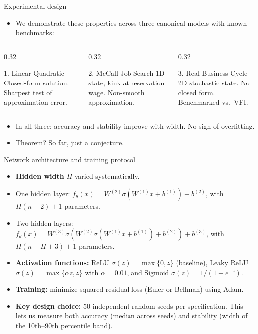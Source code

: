\documentclass[aspectratio=169,10pt]{beamer}
\newcommand{\emphcolor}[1]{\textbf{\textcolor{emphcolorval}{#1}}}
\begin{document}
\begin{frame}{Experimental design}
	\begin{itemize}
		\item We demonstrate these properties across three canonical models with known benchmarks:
	\end{itemize}
	\vspace{0.1in}
	\begin{columns}
		\begin{column}{0.32\textwidth}
			\begin{block}{1. Linear-Quadratic}
				Closed-form solution. Sharpest test of approximation error.
			\end{block}
		\end{column}
		\begin{column}{0.32\textwidth}
			\begin{block}{2. McCall Job Search}
				1D state, kink at reservation wage. Non-smooth approximation.
			\end{block}
		\end{column}
		\begin{column}{0.32\textwidth}
			\begin{block}{3. Real Business Cycle}
				2D stochastic state. No closed form. Benchmarked vs.\ VFI.
			\end{block}
		\end{column}
	\end{columns}
	\vspace{0.15in}
	\begin{itemize}
		\item In all three: accuracy and stability improve with width. No sign of overfitting.
		\item Theorem? So far, just a conjecture.
	\end{itemize}
\end{frame}

\begin{frame}{Network architecture and training protocol}
	\begin{itemize}
		\item \emphcolor{Hidden width} $H$ varied systematically.
		\item One hidden layer: $f_\theta(x) = W^{(2)} \sigma\!\left(W^{(1)}x + b^{(1)}\right) + b^{(2)}$, with $H(n+2)+1$ parameters.
		\item Two hidden layers: $f_\theta(x) = W^{(3)} \sigma\!\left(W^{(2)} \sigma\!\left(W^{(1)}x + b^{(1)}\right) + b^{(2)}\right) + b^{(3)}$, with $H(n+H+3)+1$ parameters.
		\item \emphcolor{Activation functions:} ReLU $\sigma(z) = \max\{0,z\}$ (baseline), Leaky ReLU $\sigma(z) = \max\{\alpha z, z\}$ with $\alpha = 0.01$, and Sigmoid $\sigma(z) = 1/(1+e^{-z})$.
		\item \emphcolor{Training:} minimize squared residual loss (Euler or Bellman) using Adam.
		\item \emphcolor{Key design choice:} 50 independent random seeds per specification. This lets us measure both accuracy (median across seeds) and stability (width of the 10th--90th percentile band).
	\end{itemize}
\end{frame}
\end{document}
